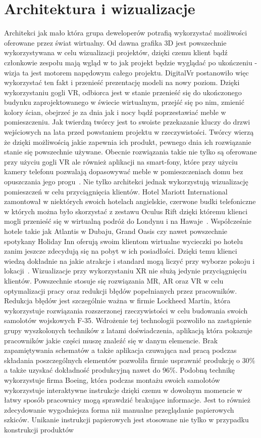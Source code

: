  \section{Architektura i wizualizacje}
\label{sec:architektura}
	Architekci jak mało która grupa deweloperów potrafią wykorzystać możliwości oferowane przez świat wirtualny. Od dawna grafika 3D jest powszechnie wykorzystywana w celu wizualizacji projektów, dzięki czemu klient bądź członkowie zespołu mają wgląd w to jak projekt będzie wyglądać po ukończeniu - wizja ta jest motorem napędowym całego projektu. DigitalVr postanowiło więc wykorzystać ten fakt i przenieść prezentację modeli na nowy poziom. Dzięki wykorzystaniu gogli VR, odbiorca jest w stanie przenieść się do ukończonego budynku zaprojektowanego w świecie wirtualnym, przejść się po nim, zmienić kolory ścian, obejrzeć je za dnia jak i nocy bądź poprzestawiać meble w pomieszczeniu. Jak twierdzą twórcy jest to swoiste przekazanie kluczy do drzwi wejściowych na lata przed powstaniem projektu w rzeczywistości. Twórcy wierzą że dzięki możliwością jakie zapewnia ich produkt, pewnego dnia ich rozwiązanie stanie się powszechnie używane. Obecnie rozwiązania takie nie tylko są oferowane przy użyciu gogli VR ale również aplikacji na smart-fony, które przy użyciu kamery telefonu pozwalają dopasowywać meble w pomieszczeniach domu bez opuszczania jego progu~\cite{arch}. Nie tylko architekci jednak wykorzystują wizualizację pomieszczeń w celu  przyciągnięcia klientów. Hotel Mariott International zamontował w niektórych swoich hotelach angielskie, czerwone budki telefoniczne w których można było skorzystać z zestawu Oculus Rift dzięki któremu klienci mogli przenieść się w wirtualną podróż do Londynu i na Hawaje~\cite{hotel2}. Współcześnie hotele takie jak Atlantis w Dubaju, Grand Oasis czy nawet powszechnie spotykany Holiday Inn oferują swoim klientom wirtualne wycieczki po hotelu zanim jeszcze zdecydują się na pobyt w ich posiadłości. Dzięki temu klienci wiedzą dokładnie na jakie atrakcje i standard mogą liczyć przy wyborze pokoju i lokacji~\cite{hotel1}. Wizualizacje przy wykorzystaniu XR nie służą jedynie przyciągnięciu klientów. Powszechnie stosuje się rozwiązania MR, AR oraz VR w celu optymalizacji pracy oraz redukcji błędów popełnianych przez pracowników.  Redukcja błędów jest szczególnie ważna w firmie Lockheed Martin, która wykorzystuje rozwiązania rozszerzonej rzeczywistości w celu budowania swoich samolotów wojskowych F-35. Wdrożenie tej technologii pozwoliło na zastąpienie grupy  wyszkolonych techników z latami doświadczenia, aplikacją która pokazuje pracowników jakie części muszę znaleźć się w danym elemencie. Brak zapamiętywania schematów a także aplikacja czuwająca nad pracą podczas składania poszczególnych elementów pozwoliła firmie usprawnić produkcję o $30\%$ a także uzyskać dokładność produkcyjną nawet do $96\%$. Podobną technikę wykorzystuje firma Boeing, która podczas montażu swoich samolotów wykorzystuje interaktywne instrukcje dzięki czemu w dowolnym momencie w łatwy sposób pracownicy mogą sprawdzić brakujące informacje. Jest to również zdecydowanie wygodniejsza forma niż manualne przeglądanie papierowych szkiców. Unikanie instrukcji papierowych jest stosowane nie tylko w przypadku  konstrukcji produktów 